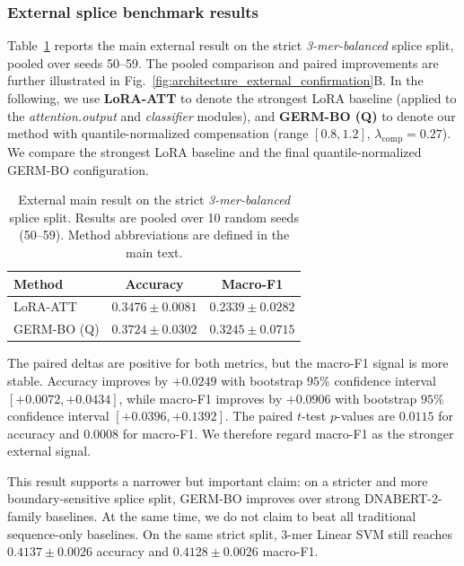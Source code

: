 \documentclass[12pt,letterpaper]{article}
\newcommand{\splitname}[1]{\textit{#1}}
\newcommand{\modpath}[1]{\textit{#1}}
\begin{document}
\subsubsection*{External splice benchmark results}

Table~\ref{tab:external-main} reports the main external result on the strict \splitname{3-mer-balanced} splice split, pooled over seeds 50--59. The pooled comparison and paired improvements are further illustrated in Fig.~\ref{fig:architecture_external_confirmation}B. In the following, we use \textbf{LoRA-ATT} to denote the strongest LoRA baseline (applied to the \modpath{attention.output} and \modpath{classifier} modules), and \textbf{GERM-BO (Q)} to denote our method with quantile-normalized compensation (range $[0.8, 1.2]$, $\lambda_{\mathrm{comp}}=0.27$). We compare the strongest LoRA baseline and the final quantile-normalized GERM-BO configuration.

\begin{table}[!htb]
\centering
\caption{External main result on the strict \splitname{3-mer-balanced} splice split. Results are pooled over 10 random seeds (50--59). Method abbreviations are defined in the main text.}
\label{tab:external-main}
\small
\begin{tabular}{@{}lcc@{}}
\toprule
Method & Accuracy & Macro-F1 \\
\midrule
LoRA-ATT & $0.3476 \pm 0.0081$ & $0.2339 \pm 0.0282$ \\
GERM-BO (Q) & $\mathbf{0.3724 \pm 0.0302}$ & $\mathbf{0.3245 \pm 0.0715}$ \\
\bottomrule
\end{tabular}
\end{table}



The paired deltas are positive for both metrics, but the macro-F1 signal is more stable. Accuracy improves by $+0.0249$ with bootstrap $95\%$ confidence interval $[+0.0072, +0.0434]$, while macro-F1 improves by $+0.0906$ with bootstrap $95\%$ confidence interval $[+0.0396, +0.1392]$. The paired $t$-test $p$-values are $0.0115$ for accuracy and $0.0008$ for macro-F1. We therefore regard macro-F1 as the stronger external signal.

This result supports a narrower but important claim: on a stricter and more boundary-sensitive splice split, GERM-BO improves over strong DNABERT-2-family baselines. At the same time, we do not claim to beat all traditional sequence-only baselines. On the same strict split, $3$-mer Linear SVM still reaches $0.4137 \pm 0.0026$ accuracy and $0.4128 \pm 0.0026$ macro-F1.
\end{document}
